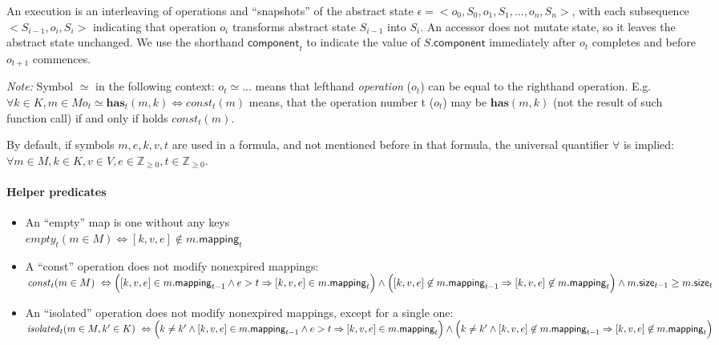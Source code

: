\documentclass{article}
\renewcommand{\o}[1]{\ensuremath{\mathbf{#1}}}
\newcommand{\p}[1]{\ensuremath{\mathit{#1}}}
\newcommand{\s}[1]{\ensuremath{\mathsf{#1}}}
\newcommand{\nintset}{\ensuremath{\mathds{Z}_{\ge 0}}}
\begin{document}
An execution is an interleaving of operations and ``snapshots'' of the abstract state
$\epsilon = <o_0, S_0, o_1, S_1, ..., o_n, S_n>$, with
each subsequence $<S_{i-1}, o_i, S_i>$ indicating that operation $o_i$ transforms abstract state $S_{i-1}$ into $S_i$.
An accessor does not mutate state, so it leaves the abstract state unchanged.
We use the shorthand $\s{component}_t$ to indicate the value of $S.$\s{component} immediately after $o_t$ completes and before $o_{t+1}$ commences.

{\it Note:} Symbol $\simeq$ in the following context: $o_t\simeq ...$ means that lefthand {\it operation} ($o_t$) can be equal to the righthand operation. E.g. $\forall k \in K, m \in M o_t\simeq \o{has}_t(m, k) \Leftrightarrow \p{const}_t(m)$ means, that the operation number t ($o_t$) may be $\o{has}(m, k)$ (not the result of such function call) if and only if holds $\p{const}_t(m)$.

By default, if symbols $m, e, k, v, t$ are used in a formula, and not mentioned before in that formula, the universal quantifier $\forall$ is implied: $\forall m\in M, k \in K, v\in V, e\in \nintset, t\in \nintset$.

\paragraph{Helper predicates}
\begin{itemize}
\item An ``empty'' map is one without any keys \\
  $\p{empty}_t(m\in M) \Leftrightarrow [k, v, e] \not\in m.\s{mapping}_t$
\item A ``const'' operation does not modify nonexpired mappings:\\
  $\p{const}_t(m\in M) ~\Leftrightarrow~\\ \Big([k, v, e] \in m.\s{mapping}_{t-1} \wedge e>t \Rightarrow [k, v, e] \in m.\s{mapping}_t\Big)\wedge\\ \Big([k, v, e] \not\in m.\s{mapping}_{t-1} \Rightarrow [k, v, e] \not\in m.\s{mapping}_t\Big)\wedge m.\s{size}_{t-1} \ge m.\s{size}_t$
\item An ``isolated'' operation does not modify nonexpired mappings, except for a single one:\\
  $\p{isolated}_t(m\in M, k'\in K) ~\Leftrightarrow~\\ \Big(k\neq k' \wedge [k, v, e] \in m.\s{mapping}_{t-1} \wedge e>t \Rightarrow [k, v, e] \in m.\s{mapping}_t\Big)\wedge\\ \Big(k\neq k' \wedge [k, v, e] \not\in m.\s{mapping}_{t-1} \Rightarrow [k, v, e] \not\in m.\s{mapping}_t\Big)$
\end{itemize}
\end{document}
